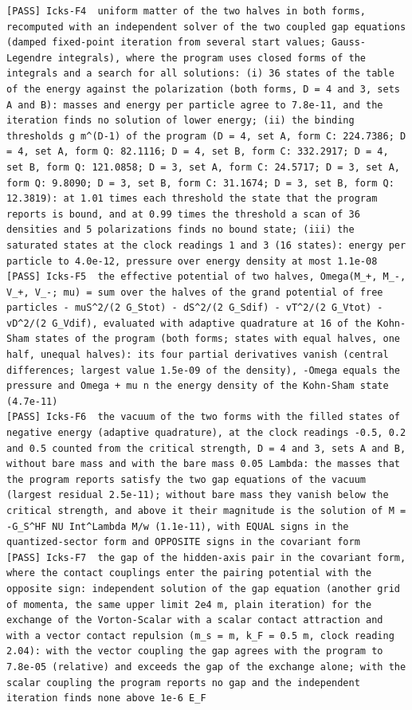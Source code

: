 \documentclass[
  10pt,
]{article}
\begin{document}
\begin{verbatim}
[PASS] Icks-F4  uniform matter of the two halves in both forms, recomputed with an independent solver of the two coupled gap equations (damped fixed-point iteration from several start values; Gauss-Legendre integrals), where the program uses closed forms of the integrals and a search for all solutions: (i) 36 states of the table of the energy against the polarization (both forms, D = 4 and 3, sets A and B): masses and energy per particle agree to 7.8e-11, and the iteration finds no solution of lower energy; (ii) the binding thresholds g m^(D-1) of the program (D = 4, set A, form C: 224.7386; D = 4, set A, form Q: 82.1116; D = 4, set B, form C: 332.2917; D = 4, set B, form Q: 121.0858; D = 3, set A, form C: 24.5717; D = 3, set A, form Q: 9.8090; D = 3, set B, form C: 31.1674; D = 3, set B, form Q: 12.3819): at 1.01 times each threshold the state that the program reports is bound, and at 0.99 times the threshold a scan of 36 densities and 5 polarizations finds no bound state; (iii) the saturated states at the clock readings 1 and 3 (16 states): energy per particle to 4.0e-12, pressure over energy density at most 1.1e-08
[PASS] Icks-F5  the effective potential of two halves, Omega(M_+, M_-, V_+, V_-; mu) = sum over the halves of the grand potential of free particles - muS^2/(2 G_Stot) - dS^2/(2 G_Sdif) - vT^2/(2 G_Vtot) - vD^2/(2 G_Vdif), evaluated with adaptive quadrature at 16 of the Kohn-Sham states of the program (both forms; states with equal halves, one half, unequal halves): its four partial derivatives vanish (central differences; largest value 1.5e-09 of the density), -Omega equals the pressure and Omega + mu n the energy density of the Kohn-Sham state (4.7e-11)
[PASS] Icks-F6  the vacuum of the two forms with the filled states of negative energy (adaptive quadrature), at the clock readings -0.5, 0.2 and 0.5 counted from the critical strength, D = 4 and 3, sets A and B, without bare mass and with the bare mass 0.05 Lambda: the masses that the program reports satisfy the two gap equations of the vacuum (largest residual 2.5e-11); without bare mass they vanish below the critical strength, and above it their magnitude is the solution of M = -G_S^HF NU Int^Lambda M/w (1.1e-11), with EQUAL signs in the quantized-sector form and OPPOSITE signs in the covariant form
[PASS] Icks-F7  the gap of the hidden-axis pair in the covariant form, where the contact couplings enter the pairing potential with the opposite sign: independent solution of the gap equation (another grid of momenta, the same upper limit 2e4 m, plain iteration) for the exchange of the Vorton-Scalar with a scalar contact attraction and with a vector contact repulsion (m_s = m, k_F = 0.5 m, clock reading 2.04): with the vector coupling the gap agrees with the program to 7.8e-05 (relative) and exceeds the gap of the exchange alone; with the scalar coupling the program reports no gap and the independent iteration finds none above 1e-6 E_F

\end{verbatim}
\end{document}
